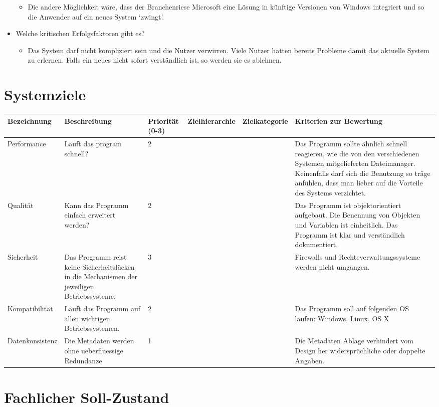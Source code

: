 \documentclass[10pt,paper=a4,final]{scrartcl}
\begin{document}
\begin{itemize}
\begin{itemize}
      \item Die andere Möglichkeit wäre, dass der Branchenriese Microsoft eine Lösung in künftige Versionen von Windows integriert und so die Anwender auf ein neues System ‘zwingt’.
    \end{itemize}
  \item Welche kritischen Erfolgsfaktoren gibt es?
    \begin{itemize}
      \item Das System darf nicht kompliziert sein und die Nutzer verwirren. Viele Nutzer hatten bereits Probleme damit das aktuelle System zu erlernen. Falls ein neues nicht sofort verständlich ist, so werden sie es ablehnen.
    \end{itemize}
\end{itemize}
\newpage
\section{Systemziele}
\begin{tabular}{ |l|p{2.5cm}|l|l|l|p{4.0cm}| }
  \hline
  \bf Bezeichnung & \bf Beschreibung & \bf Priorit\"at (0-3) & \bf Zielhierarchie & \bf Zielkategorie & \bf Kriterien zur Bewertung \\ \hline
  Performance & L\"auft das program schnell? & 2 & & & Das Programm sollte ähnlich schnell reagieren, wie die von den verschiedenen Systemen mitgelieferten Dateimanager.
  Keinenfalls darf sich die Benutzung so träge anfühlen, dass man lieber auf die Vorteile des Systems verzichtet. \\ \hline
  Qualit\"at & Kann das Programm einfach erweitert werden? & 2 & & & Das Programm ist objektorientiert aufgebaut.
  Die Benennung von Objekten und Variablen ist einheitlich.
  Das Programm ist klar und verständlich dokumentiert. \\ \hline
  Sicherheit & Das Programm reist keine Sicherheitslücken in die Mechanismen der jeweiligen Betriebssysteme. & 3 & & & Firewalls und Rechteverwaltungssysteme werden nicht umgangen. \\ \hline
  Kompatibilit\"at & Läuft das Programm auf allen wichtigen Betriebssystemen. & 2 & & & Das Programm soll auf folgenden OS laufen: Windows, Linux, OS X \\ \hline
  Datenkonsistenz & Die Metadaten werden ohne ueberfluessige Redundanze & 1 & & & Die Metadaten Ablage verhindert vom Design her widersprüchliche oder doppelte Angaben. \\ \hline
\end{tabular}
\section{Fachlicher Soll-Zustand}
\end{document}
